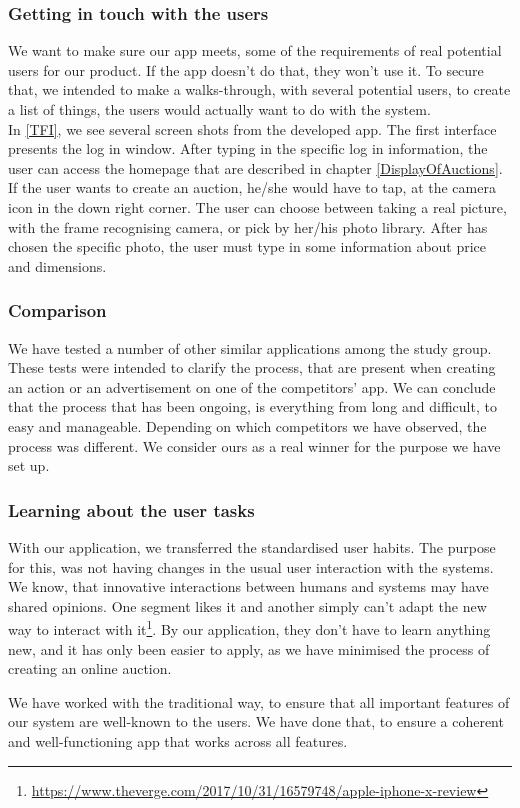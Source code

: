 \subsubsection*{Getting in touch with the users}

We want to make sure our app meets, some of the requirements of real potential users for our product. If the app doesn’t do that, they won't use it. To secure that, we intended to make a walks-through, with several potential users, to create a list of things, the users would actually want to do with the system.\\

In \ref{TFI}, we see several screen shots from the developed app. The first interface presents the log in window. After typing in the specific log in information, the user can access the homepage that are described in chapter \ref{DisplayOfAuctions}.\\

If the user wants to create an auction, he/she would have to tap, at the camera icon in the down right corner. The user can choose between taking a real picture, with the frame recognising camera, or pick by her/his photo library. After has chosen the specific photo, the user must type in some information about price and dimensions. 

\subsubsection*{Comparison}

We have tested a number of other similar applications among the study group. These tests were intended to clarify the process, that are present when creating an action or an advertisement on one of the competitors' app. We can conclude that the process that has been ongoing, is everything from long and difficult, to easy and manageable. Depending on which competitors we have observed, the process was different. We consider ours as a real winner for the purpose we have set up. 

\subsubsection*{Learning about the user tasks}

With our application, we transferred the standardised user habits. The purpose for this, was not having changes in the usual user interaction with the systems. We know, that innovative interactions between humans and systems may have shared opinions. One segment likes it and another simply can't adapt the new way to interact with it\footnote{\url{https://www.theverge.com/2017/10/31/16579748/apple-iphone-x-review}}. By our application, they don’t have to learn anything new, and it has only been easier to apply, as we have minimised the process of creating an online auction.

We have worked with the traditional way, to ensure that all important features of our system are well-known to the users. We have done that, to ensure a coherent and well-functioning app that works across all features.
